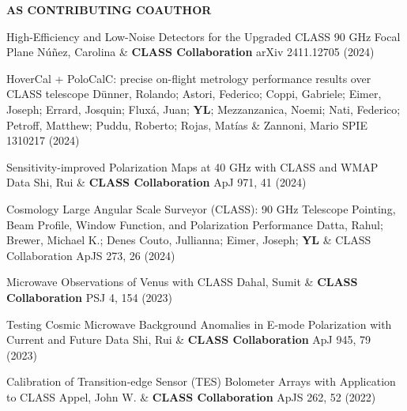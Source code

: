 \begin{footnotesize}
    \textsf{\textbf{ AS CONTRIBUTING COAUTHOR }}
\end{footnotesize}
\begin{etaremune}[topsep=0pt,itemsep=0pt,partopsep=0pt,parsep=0pt]
    \renewcommand\labelenumi{\footnotesize\bfseries\theenumi.}
    
            {High-Efficiency and Low-Noise Detectors for the Upgraded CLASS 90 GHz Focal Plane}
            {Núñez, Carolina \& \textbf{CLASS Collaboration}}
            {arXiv 2411.12705 (2024)}
    
            {HoverCal + PoloCalC: precise on-flight metrology performance results over CLASS telescope}
            {Dünner, Rolando; Astori, Federico; Coppi, Gabriele; Eimer, Joseph; Errard, Josquin; Fluxá, Juan; \textbf{YL}; Mezzanzanica, Noemi; Nati, Federico; Petroff, Matthew; Puddu, Roberto; Rojas, Matías \& Zannoni, Mario}
            {SPIE 1310217 (2024)}
    
            {Sensitivity-improved Polarization Maps at 40 GHz with CLASS and WMAP Data}
            {Shi, Rui \& \textbf{CLASS Collaboration}}
            {ApJ 971, 41 (2024)}
    
            {Cosmology Large Angular Scale Surveyor (CLASS): 90 GHz Telescope Pointing, Beam Profile, Window Function, and Polarization Performance}
            {Datta, Rahul; Brewer, Michael K.; Denes Couto, Jullianna; Eimer, Joseph; \textbf{YL} \& CLASS Collaboration}
            {ApJS 273, 26 (2024)}
    
            {Microwave Observations of Venus with CLASS}
            {Dahal, Sumit \& \textbf{CLASS Collaboration}}
            {PSJ 4, 154 (2023)}
    
            {Testing Cosmic Microwave Background Anomalies in E-mode Polarization with Current and Future Data}
            {Shi, Rui \& \textbf{CLASS Collaboration}}
            {ApJ 945, 79 (2023)}
    
            {Calibration of Transition-edge Sensor (TES) Bolometer Arrays with Application to CLASS}
            {Appel, John W. \& \textbf{CLASS Collaboration}}
            {ApJS 262, 52 (2022)}
    

\end{etaremune}
